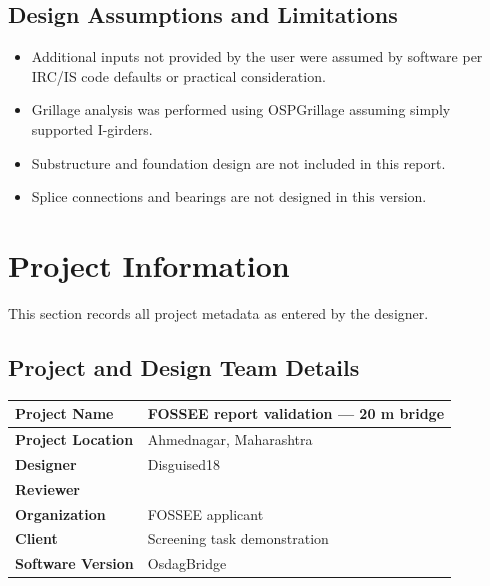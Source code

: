 \documentclass[12pt,a4paper]{report}
\numberwithin{table}{chapter}
\numberwithin{figure}{chapter}
\begin{document}
\section*{Design Assumptions and Limitations}
\label{sec:assumptions}

\begin{itemize}
\item Additional inputs not provided by the user were assumed by software per IRC/IS code defaults or practical consideration.
\item Grillage analysis was performed using OSPGrillage assuming simply supported I-girders.
\item Substructure and foundation design are not included in this report.
\item Splice connections and bearings are not designed in this version.
\end{itemize}

\titleformat{\chapter}[block]{\normalfont\Large\bfseries\centering}{\thechapter}{1em}{}
\titlespacing*{\chapter}{0pt}{-30pt}{10pt}


\chapter{Project Information}

This section records all project metadata as entered by the designer.

\section{Project and Design Team Details}
\label{sec:project-details}

\begin{tabular}{|L{5.5cm}|L{8.5cm}|}
\hline
\textbf{Project Name} & FOSSEE report validation — 20 m bridge \\
\hline
\textbf{Project Location} & Ahmednagar, Maharashtra \\
\hline
\textbf{Designer} & Disguised18 \\
\hline
\textbf{Reviewer} &  \\
\hline
\textbf{Organization} & FOSSEE applicant \\
\hline
\textbf{Client} & Screening task demonstration \\
\hline
\textbf{Software Version} & OsdagBridge \\
\hline
\end{tabular}
\end{document}
